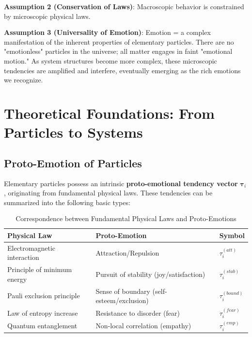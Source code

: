 \documentclass[12pt,a4paper]{article}
\theoremstyle{plain}
\newcommand{\ve}[1]{\bm{#1}}                    %
\begin{document}
\textbf{Assumption 2 (Conservation of Laws)}: Macroscopic behavior is constrained by microscopic physical laws.

\textbf{Assumption 3 (Universality of Emotion)}: Emotion = a complex manifestation of the inherent properties of elementary particles. There are no "emotionless" particles in the universe; all matter engages in faint "emotional motion." As system structures become more complex, these microscopic tendencies are amplified and interfere, eventually emerging as the rich emotions we recognize.

\section{Theoretical Foundations: From Particles to Systems}

\subsection{Proto-Emotion of Particles}

Elementary particles possess an intrinsic \textbf{proto-emotional tendency vector} $\ve{\tau}_i$, originating from fundamental physical laws. These tendencies can be summarized into the following basic types:

\begin{table}[h]
\centering
\caption{Correspondence between Fundamental Physical Laws and Proto-Emotions}
\begin{tabular}{lll}
\toprule
\textbf{Physical Law} & \textbf{Proto-Emotion} & \textbf{Symbol} \\
\midrule
Electromagnetic interaction & Attraction/Repulsion & $\tau_i^{(att)}$ \\
Principle of minimum energy & Pursuit of stability (joy/satisfaction) & $\tau_i^{(stab)}$ \\
Pauli exclusion principle & Sense of boundary (self-esteem/exclusion) & $\tau_i^{(bound)}$ \\
Law of entropy increase & Resistance to disorder (fear) & $\tau_i^{(fear)}$ \\
Quantum entanglement & Non-local correlation (empathy) & $\tau_i^{(emp)}$ \\
\bottomrule
\end{tabular}
\end{table}
\end{document}
